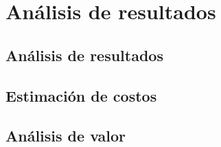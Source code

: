 
\chapter{Análisis de resultados}

\section{Análisis de resultados}

\section{Estimación de costos}

\section{Análisis de valor}

\newpage

